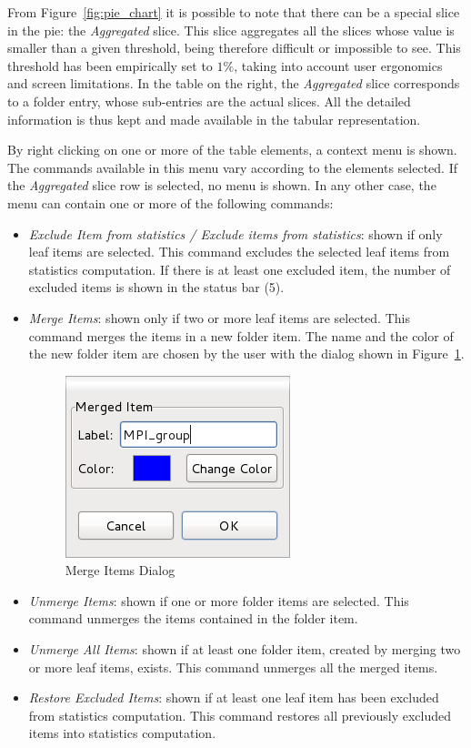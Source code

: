 \documentclass[twoside]{article}
\begin{document}
\begin{sloppypar}
From Figure~\ref{fig:pie_chart} it is possible to note that there can be a special slice in the pie: the \emph{Aggregated} slice.
This slice aggregates all the slices whose value is smaller than a given threshold, being therefore difficult or impossible to see.
This threshold has been empirically set to $1\%$, taking into account user ergonomics and screen limitations.
In the table on the right, the \emph{Aggregated} slice corresponds to a folder entry, whose sub-entries are the actual slices.
All the detailed information is thus kept and made available in the tabular representation.

By right clicking on one or more of the table elements, a context menu is shown.
The commands available in this menu vary according to the elements selected.
If the \emph{Aggregated} slice row is selected, no menu is shown.
In any other case, the menu can contain one or more of the following commands:
\begin{itemize}
 \item \emph{Exclude Item from statistics / Exclude items from statistics}: shown if only leaf items are selected. This command excludes the selected leaf items from statistics computation. If there is at least one excluded item, the number of excluded items is shown in the status bar (\num{5}).
 \item \emph{Merge Items}: shown only if two or more leaf items are selected. This command merges the items in a new folder item. The name and the color of the new folder item are chosen by the user with the dialog shown in Figure~\ref{fig:merge_dialog}.
    \begin{figure}[h!]
      \centering
	\includegraphics[width=.25\textwidth]{images/dialog_merge.png}
      \caption{Merge Items Dialog}
      \label{fig:merge_dialog}
    \end{figure} 
 \item \emph{Unmerge Items}: shown if one or more folder items are selected. This command unmerges the items contained in the folder item.
 \item \emph{Unmerge All Items}: shown if at least one folder item, created by merging two or more leaf items, exists. This command unmerges all the merged items. 
 \item \emph{Restore Excluded Items}: shown if at least one leaf item has been excluded from statistics computation. This command restores all previously excluded items into statistics computation.
\end{itemize}


\end{sloppypar}
\end{document}
